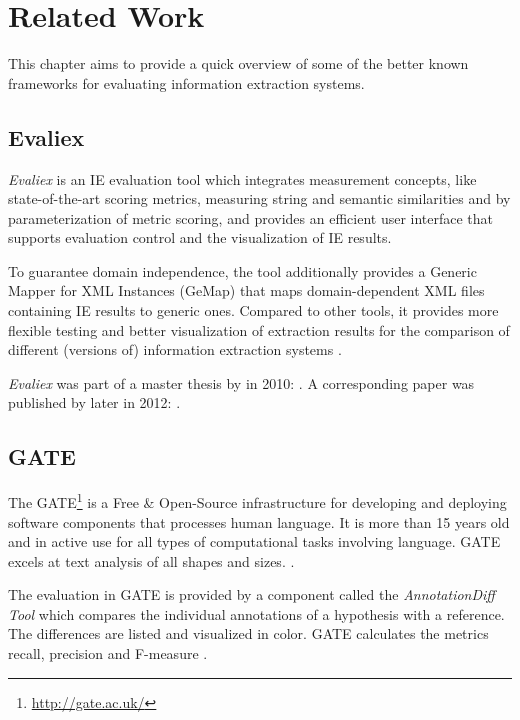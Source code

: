 \section{Related Work}
\label{sec:related-work}
This chapter aims to provide a quick overview of some of the better known frameworks for evaluating information extraction systems.

\subsection{Evaliex}
\textit{Evaliex} is an \gls{IE} evaluation tool which integrates measurement concepts, like state-of-the-art scoring metrics, measuring string and semantic similarities and by parameterization of metric scoring, and provides an efficient user interface that supports evaluation control and the visualization of \gls{IE} results.

To guarantee domain independence, the tool additionally provides a Generic Mapper for XML Instances (GeMap) that maps domain-dependent XML files containing \gls{IE} results to generic ones. Compared to other tools, it provides more flexible testing and better visualization of extraction results for the comparison of different (versions of) information extraction systems \cite{Feilmayr:2012}.

\textit{Evaliex}  was part of a master thesis by \citeauthor{Linsmayr:2010} in 2010:  \cite{Linsmayr:2010}. A corresponding paper was published by \citeauthor{Feilmayr:2012} later in 2012:  \cite{Feilmayr:2012}.

\subsection{GATE}
The \gls{GATE}\footnote{\url{http://gate.ac.uk/}} is a Free \& Open-Source infrastructure for developing and deploying software components that processes human language. It is more than 15 years old and in active use for all types of computational tasks involving language. GATE excels at text analysis of all shapes and sizes. \cite{Cunningham:2011}. 

The evaluation in GATE is provided by a component called the \textit{AnnotationDiff Tool} which compares the individual annotations of a hypothesis with a reference. The differences are listed and visualized in color. GATE calculates the metrics recall, precision and F-measure \cite{Linsmayr:2010}.


